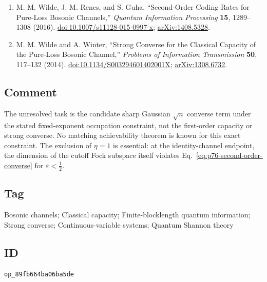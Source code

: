 \begin{enumerate}[label={},leftmargin=4.8em,labelsep=0.5em]
  \footnotesize
  \item[\textup{[WRG16]}]\label{ref:p76-wilde-renes-guha}
  M. M. Wilde, J. M. Renes, and S. Guha, ``Second-Order Coding Rates for
  Pure-Loss Bosonic Channels,'' \emph{Quantum Information Processing}
  \textbf{15}, 1289--1308 (2016).
  \href{https://doi.org/10.1007/s11128-015-0997-x}%
       {doi:10.1007/s11128-015-0997-x};
  \href{https://arxiv.org/abs/1408.5328}{arXiv:1408.5328}.

  \item[\textup{[WW14]}]\label{ref:p76-wilde-winter}
  M. M. Wilde and A. Winter, ``Strong Converse for the Classical Capacity of
  the Pure-Loss Bosonic Channel,'' \emph{Problems of Information
  Transmission} \textbf{50}, 117--132 (2014).
  \href{https://doi.org/10.1134/S003294601402001X}%
       {doi:10.1134/S003294601402001X};
  \href{https://arxiv.org/abs/1308.6732}{arXiv:1308.6732}.
\end{enumerate}

\subsection*{Comment}

The unresolved task is the candidate sharp Gaussian $\sqrt n$ converse term
under the stated fixed-exponent occupation constraint, not the first-order
capacity or strong converse.  No matching achievability theorem is known for
this exact constraint.  The exclusion of $\eta=1$ is essential: at the
identity-channel endpoint, the dimension of the cutoff Fock subspace itself
violates Eq.~\eqref{eq:p76-second-order-converse} for
$\varepsilon<\tfrac12$.

\subsection*{Tag}

Bosonic channels; Classical capacity; Finite-blocklength quantum information;
Strong converse; Continuous-variable systems; Quantum Shannon theory

\subsection*{ID}

\texttt{op\_89fb664ba06ba5de}
